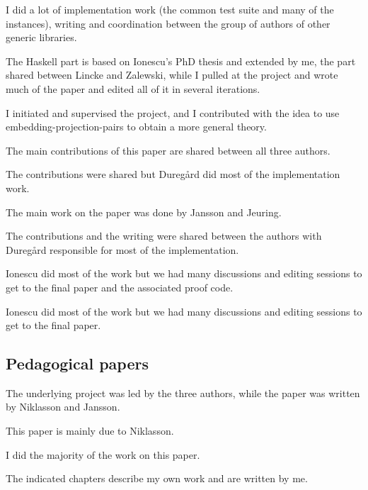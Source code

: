 \begin{itemize}
%
I did a lot of implementation work (the common test suite and
many of the instances), writing and coordination between the group of
authors of other generic libraries.

%
The Haskell part is based on Ionescu's PhD thesis and extended by me,
the \Cpp{} part shared between Lincke and Zalewski, while I pulled at the
project and wrote much of the paper and edited all of it in several
iterations.

%
I initiated and supervised the project, and I contributed with the
idea to use embedding-projection-pairs to obtain a more general
theory.

%
The main contributions of this paper are shared between all three
authors.

%
The contributions were shared but Duregård did most of the
implementation work.

%
The main work on the paper was done by Jansson and Jeuring.

%
The contributions and the writing were shared between the authors with
Duregård responsible for most of the implementation.

%
Ionescu did most of the work but we had many discussions and editing
sessions to get to the final paper and the associated proof code.

%
Ionescu did most of the work but we had many discussions and editing
sessions to get to the final paper.

\end{itemize}


\subsection{Pedagogical papers}
\begin{itemize}
%
The underlying project was led by the three authors, while the paper
was written by Niklasson and Jansson.

%
This paper is mainly due to Niklasson.

%
I did the majority of the work on this paper.

%
The indicated chapters describe my own work and are written by me.

\end{itemize}
